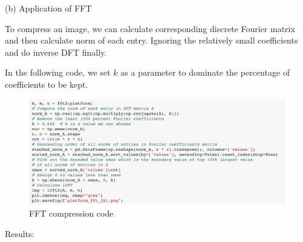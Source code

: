 \documentclass[12pt]{article}
\begin{document}
\begin{flushleft}
(b) Application of FFT

To compress an image, we can calculate corresponding discrete Fourier matrix and then calculate norm of each entry. Ignoring the relatively 
small coefficients and do inverse DFT finally. 

In the following code, we set $k$ as a parameter to dominate the percentage of coefficients to be kept.
\end{flushleft}
\begin{figure}[H]
    \centering
    \includegraphics[width=1\textwidth]{fft_compression.png}
    \caption{FFT compression code}
\end{figure}
\begin{flushleft}
Results:
\end{flushleft}
\end{document}
